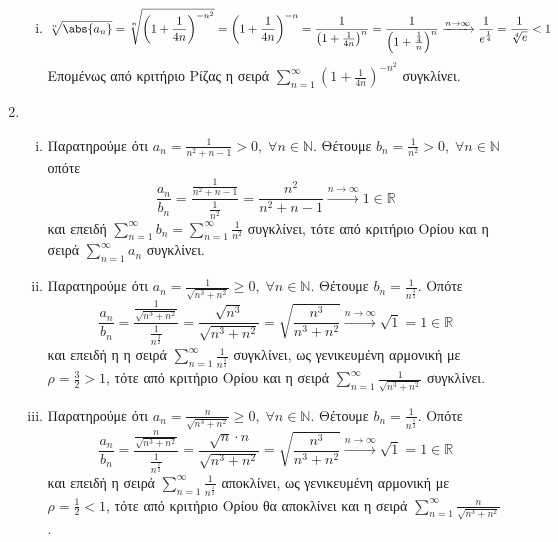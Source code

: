 \begin{enumerate}
\begin{enumerate}[i)]
      \item 
        \[
          \sqrt[n]{\abs{a_{n}}} = \sqrt[n]{\left(1+ \frac{1}{4n} 
          \right)^{-n^{2}}} = \left(1+ \frac{1}{4n} \right)^{-n} = 
          \frac{1}{\left(1+ \frac{1}{4n} \right)^{n}} = 
          \frac{1}{\left(1 + \frac{\frac{1}{4}}{n}\right)^{n}} 
          \xrightarrow{n \to \infty} \frac{1}{e ^{\frac{1}{4}}} = 
          \frac{1}{\sqrt[4]{e}} <1 
        \] 
        Επομένως από κριτήριο Ρίζας η σειρά 
        $ \sum_{n=1}^{\infty} \left(1+ \frac{1}{4n} \right)^{-n^{2}} $ συγκλίνει.
    \end{enumerate}

  \item 
    \begin{enumerate}[i)]
      \item Παρατηρούμε ότι $ a_{n}= \frac{1}{n^{2}+n-1} > 0, 
        \; \forall n \in \mathbb{N}$. Θέτουμε 
        $
        b_{n} = \frac{1}{n^{2}} > 0, \; \forall n \in \mathbb{N} 
        $ οπότε
        \[
          \frac{a_{n}}{b_{n}} = \frac{\frac{1}{n^{2}+n-1}}{\frac{1}{n^{2}}} = 
          \frac{n^{2}}{n^{2}+n-1} \xrightarrow{n \to \infty} 1 \in \mathbb{R} 
        \] 
        και επειδή $ \sum_{n=1}^{\infty} b_{n} = \sum_{n=1}^{\infty} 
        \frac{1}{n^{2}} $ συγκλίνει, τότε από κριτήριο Ορίου και η σειρά 
        $ \sum_{n=1}^{\infty} a_{n} $ συγκλίνει.


      \item Παρατηρούμε ότι $ a_{n}= \frac{1}{\sqrt{n^{3}+n^{2}}} \geq 0, 
        \; \forall n \in \mathbb{N}$. Θέτουμε $ b_{n} = \frac{1}{n^{\frac{3}{2}}} $.
        Οπότε
        \[
          \frac{a_{n}}{b_{n}} =
          \frac{\frac{1}{\sqrt{n^{3}+n^{2}}}}{\frac{1}{n^{\frac{3}{2}}}} = 
          \frac{\sqrt{n^{3}}}{\sqrt{n^{3}+n^{2}}} = 
          \sqrt{\frac{n^{3}}{n^{3}+n^{2}}}
          \xrightarrow{n \to \infty} \sqrt{1}=1 \in \mathbb{R} 
        \] 
        και επειδή η η σειρά $ \sum_{n=1}^{\infty} \frac{1}{n^{\frac{3}{2}}} $ 
        συγκλίνει, ως γενικευμένη αρμονική με $ \rho = \frac{3}{2} >1 $, τότε 
        από κριτήριο Ορίου και η σειρά $ \sum_{n=1}^{\infty} 
        \frac{1}{\sqrt{n^{3}+n^{2}} } $ συγκλίνει.

      \item Παρατηρούμε ότι $ a_{n}= \frac{n}{\sqrt{n^{3}+n^{2}}} \geq 0, 
        \; \forall n \in \mathbb{N} $. Θέτουμε $ b_{n}= \frac{1}{n^{\frac{1}{2}}} $. 
        Οπότε
        \[
          \frac{a_{n}}{b_{n}} = 
          \frac{\frac{n}{\sqrt{n^{3}+n^{2}}}}{\frac{1}{n^{\frac{1}{2}}}} =
          \frac{\sqrt{n}\cdot n}{\sqrt{n^{3}+n^{2}}} = 
          \sqrt{\frac{n^{3}}{n^{3}+n^{2}}} 
          \xrightarrow{n \to \infty} \sqrt{1}=1 \in \mathbb{R}
        \] 
        και επειδή η σειρά $ \sum_{n=1}^{\infty} \frac{1}{n^{\frac{1}{2}}} $ 
        αποκλίνει, ως γενικευμένη αρμονική με $ \rho = \frac{1}{2} <1 $, 
        τότε από κριτήριο Ορίου θα αποκλίνει και η σειρά $ 
        \sum_{n=1}^{\infty} \frac{n}{\sqrt{n^{3}+n^{2}}}$.
    \end{enumerate}


\end{enumerate}
